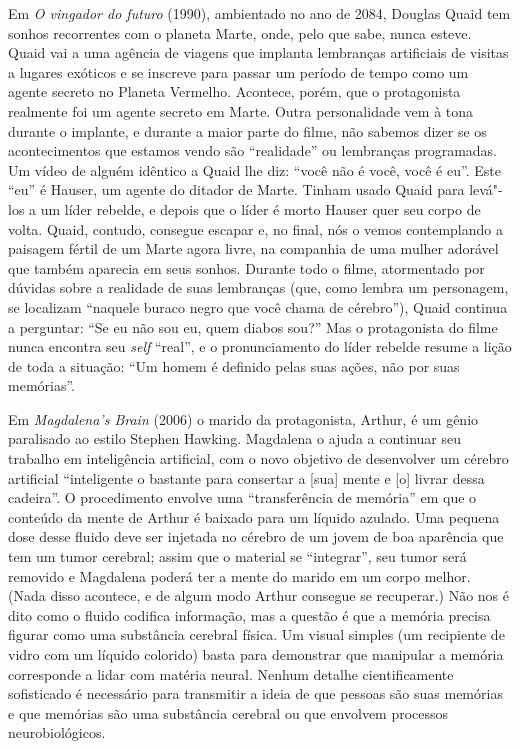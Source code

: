 Em \emph{O vingador do futuro} (1990), ambientado no ano de 2084,
Douglas Quaid tem sonhos recorrentes com o planeta Marte, onde, pelo que
sabe, nunca esteve. Quaid vai a uma agência de viagens que implanta
lembranças artificiais de visitas a lugares exóticos e se inscreve para
passar um período de tempo como um agente secreto no Planeta Vermelho.
Acontece, porém, que o protagonista realmente foi um agente secreto em
Marte. Outra personalidade vem à tona durante o implante, e durante a
maior parte do filme, não sabemos dizer se os acontecimentos que estamos
vendo são ``realidade'' ou lembranças programadas. Um vídeo de alguém
idêntico a Quaid lhe diz: ``você não é você, você é eu''. Este ``eu'' é
Hauser, um agente do ditador de Marte. Tinham usado Quaid para levá"-los
a um líder rebelde, e depois que o líder é morto Hauser quer seu corpo
de volta. Quaid, contudo, consegue escapar e, no final, nós o vemos
contemplando a paisagem fértil de um Marte agora livre, na companhia de
uma mulher adorável que também aparecia em seus sonhos. Durante todo o
filme, atormentado por dúvidas sobre a realidade de suas lembranças
(que, como lembra um personagem, se localizam ``naquele buraco negro que
você chama de cérebro''), Quaid continua a perguntar: ``Se eu não sou
eu, quem diabos sou?'' Mas o protagonista do filme nunca encontra seu
\emph{self} ``real'', e o pronunciamento do líder rebelde resume a lição de
toda a situação: ``Um homem é definido pelas suas ações, não por suas
memórias''.

Em \emph{Magdalena's Brain} (2006) o marido da protagonista, Arthur, é
um gênio paralisado ao estilo Stephen Hawking. Magdalena o ajuda a
continuar seu trabalho em inteligência artificial, com o novo objetivo
de desenvolver um cérebro artificial ``inteligente o bastante para
consertar a {[}sua{]} mente e {[}o{]} livrar dessa cadeira''. O
procedimento envolve uma ``transferência de memória'' em que o conteúdo
da mente de Arthur é baixado para um líquido azulado. Uma pequena dose
desse fluido deve ser injetada no cérebro de um jovem de boa aparência
que tem um tumor cerebral; assim que o material se ``integrar'', seu
tumor será removido e Magdalena poderá ter a mente do marido em um corpo
melhor. (Nada disso acontece, e de algum modo Arthur consegue se recuperar.)
Não nos é dito como o fluido codifica informação, mas a
questão é que a memória precisa figurar como uma substância cerebral física.
Um visual simples (um recipiente de vidro com um líquido colorido) basta
para demonstrar que manipular a memória corresponde a lidar com matéria
neural. Nenhum detalhe cientificamente sofisticado é necessário para
transmitir a ideia de que pessoas são suas memórias e que memórias são
uma substância cerebral ou que envolvem processos neurobiológicos.

